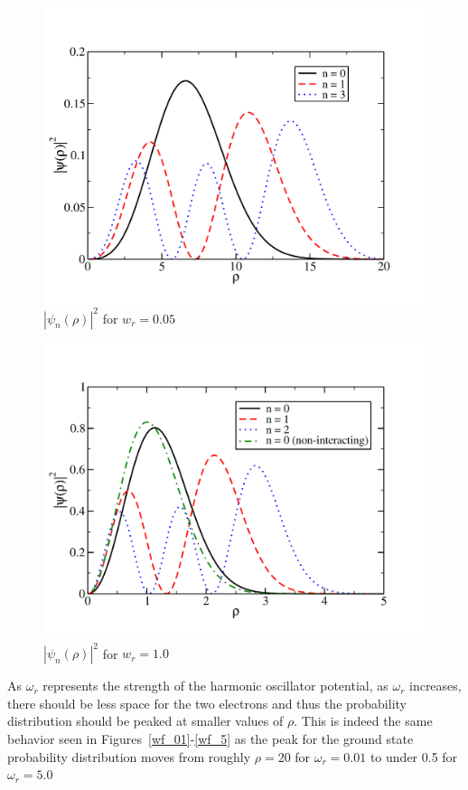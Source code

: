 \documentclass[prc,amsmath,twocolumn,superscriptaddress]{revtex4}
\begin{document}
\begin{figure}[b]
\includegraphics[scale=0.33]{wf_05.pdf}
\caption{$|\psi_n(\rho)|^2$ for $w_r = 0.05$}
\label{wf_05}
\end{figure}

\begin{figure}[t]
\includegraphics[scale=0.33]{wf_1.pdf}
\caption{$|\psi_n(\rho)|^2$ for $w_r = 1.0$}
\label{wf_1}
\end{figure}

As $\omega_r$ represents the strength of the harmonic oscillator potential, as $\omega_r$ increases, there should be less space for the two electrons and thus the probability distribution should be peaked at smaller values of $\rho$. This is indeed the same behavior seen in Figures~\ref{wf_01}-\ref{wf_5} as the peak for the ground state probability distribution moves from roughly $\rho=20$ for $\omega_r=0.01$ to under 0.5 for $\omega_r=5.0$
\end{document}
